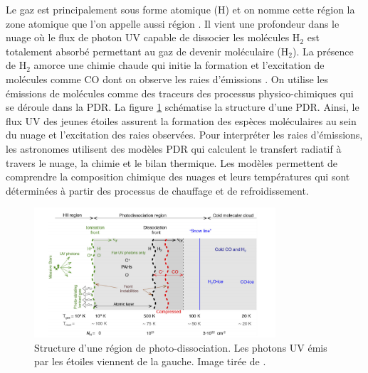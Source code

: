 \documentclass[11pt,a4paper,twoside,openright]{article}
\begin{document}
\begin{spacing}{0.98}
Le gaz est principalement sous forme atomique ($\mathrm{H}$) et on nomme cette région la zone atomique que l'on appelle aussi \og région  \fg{}. Il vient une profondeur dans le nuage où le flux de photon UV capable de dissocier les molécules $\mathrm{H}_2$ est totalement absorbé permettant au gaz de devenir moléculaire ($\mathrm{H}_2$). La présence de $\mathrm{H}_2$ amorce une chimie chaude qui initie la formation et l'excitation de molécules comme $\mathrm{CO}$ dont on observe les raies d'émissions \cite{COJoblin}. On utilise les émissions de molécules comme des traceurs des processus physico-chimiques qui se déroule dans la PDR. La figure \ref{fig:intro:struct} schématise la structure d'une PDR. Ainsi, le flux UV des jeunes étoiles assurent la formation des espèces moléculaires au sein du nuage et l'excitation des raies observées. Pour interpréter les raies d'émissions, les astronomes utilisent des modèles PDR qui calculent le transfert radiatif à travers le nuage, la chimie et le bilan thermique. Les modèles permettent de comprendre la composition chimique des nuages et leurs températures qui sont déterminées à partir des processus de chauffage et de refroidissement. \newline 

\begin{figure}[!h]
    \centering
    \includegraphics[width = 0.8\textwidth]{figure/structurepdr.pdf}
    \caption{Structure d'une région de photo-dissociation. Les photons UV émis par les étoiles viennent de la gauche. Image tirée de \cite{Goicoechea2016}.}
    \label{fig:intro:struct}
\end{figure}


\end{spacing}
\end{document}
